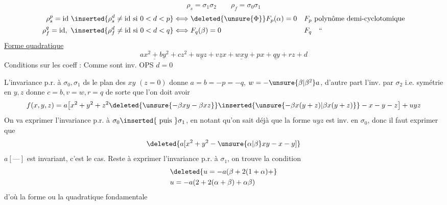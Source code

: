 \[
\rho_s=\sigma_1\sigma_2\qquad\rho_f=\sigma_0\sigma_1
\]
\[
\begin{aligned}
\rho_s^p=\mathrm{id}\ \inserted{\rho_s^d\ne\mathrm{id}\text{ si }0<d<p}
&\Longleftrightarrow\deleted{\unsure{\Phi}}F_p(\alpha)=0
&&F_p\text{ polynôme demi-cyclotomique}\\
\rho_f^q=\mathrm{id},\ \inserted{\rho_f^d\ne\mathrm{id}\text{ si }0<d<q}
&\Longleftrightarrow F_q(\beta)=0
&&F_q\quad\text{``}
\end{aligned}
\]
\uline{Forme quadratique } 
\[
\underline{ax^2+by^2}+cz^2+\underline{uyz}+\underline{vzx}+\underline{wxy}+\underline{px+qy+rz}+d
\]
Conditions sur les coeff : Comme  sont inv. OPS $d=0$

L'invariance p.r. à $\sigma_0,\sigma_1$ ds le plan des $xy$ $(z=0)$ donne $a=b=-p=-q$, $w=-\unsure{\beta|\beta^2}a$, d'autre part l'inv. par $\sigma_2$ i.e. symétrie en $y,z$ donne $c=b,v=w,r=q$ de sorte que l'on doit avoir
\[
f(x,y,z)=a\bigl[x^2+y^2+z^2\deleted{\unsure{-\beta xy-\beta xz}}\inserted{\unsure{-\beta x(y+z)|\beta x(y+z)}}-x-y-z\bigr]+uyz
\]
On va exprimer l'invariance p.r. à $\sigma_0\inserted{\text{ puis }}\sigma_1$, en notant qu'on sait déjà que la forme $uyz$ est inv. en $\sigma_0$, donc il faut  exprimer que
\[
\deleted{a[x^2+y^2-\unsure{\alpha|\beta}xy-x-y]}
\]
$a[\text{---}]$ est invariant, c'est le cas. Reste à   exprimer l'invariance p.r. à $\sigma_1$, on trouve  la condition 
\[
\begin{aligned}
&\deleted{u=-a(\beta+2(1+\alpha)+}\\
&u=-a(2+2(\alpha+\beta)+\alpha\beta)
\end{aligned}
\]
d'où la forme ou la   quadratique fondamentale

